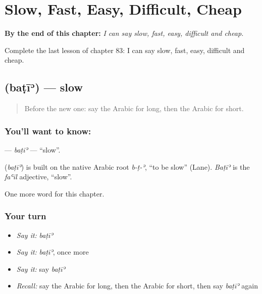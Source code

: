 
\chapter{Slow, Fast, Easy, Difficult, Cheap}
\label{ch:ar-slow-fast-easy-difficult-cheap}

\begin{chapteropening}
\textbf{By the end of this chapter:} \emph{I can say slow, fast, easy, difficult and cheap.}

Complete the last lesson of chapter 83: I can say slow, fast, easy, difficult and cheap.
\end{chapteropening}

\section[\texorpdfstring{\ar{بطيء} (baṭīʾ)}{بطيء (baṭīʾ)}]{ (baṭīʾ) — slow}

\label{lesson:AR-C83-bati}



\begin{quote}
Before the new one: say the Arabic for long, then the Arabic for short.
\end{quote}

\subsection*{You'll want to know: }
\textbf{} — \emph{baṭīʾ} — \textquotedblleft{}slow\textquotedblright{}.

\begin{cousinweb}
\textbf{} (\emph{baṭīʾ}) is built on the native Arabic root \emph{b-ṭ-ʾ}, \textquotedblleft{}to be slow\textquotedblright{} (Lane). \emph{Baṭīʾ} is the \emph{faʿīl} adjective, \textquotedblleft{}slow\textquotedblright{}.
\end{cousinweb}

\begin{grammarlens}[title={What you've built}]
One more word for this chapter.
\end{grammarlens}

\subsection*{Your turn}
\begin{itemize}
\raggedright
  \item \emph{Say it:} \emph{baṭīʾ}
  \item \emph{Say it:} \emph{baṭīʾ}, once more
  \item \emph{Say it:} say \emph{baṭīʾ}
  \item \emph{Recall:} say the Arabic for long, then the Arabic for short, then say \emph{baṭīʾ} again
\end{itemize}

